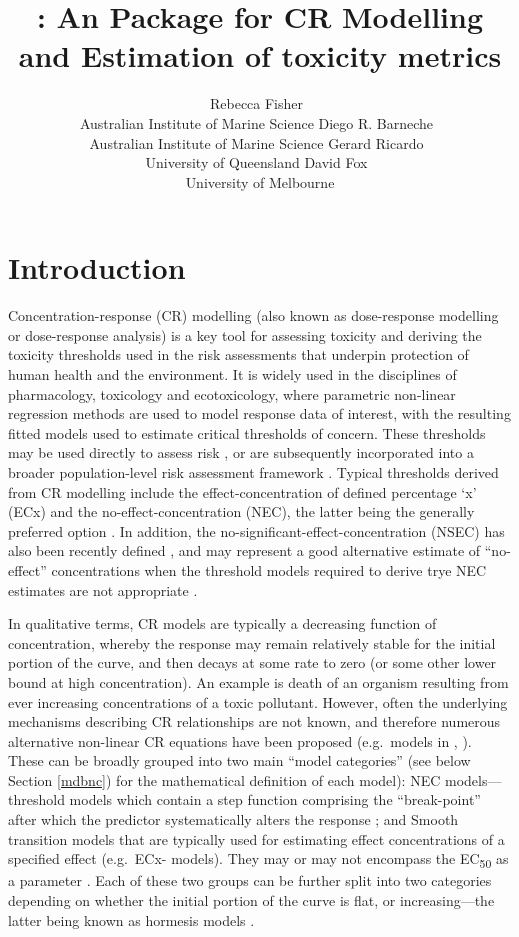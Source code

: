 \documentclass[
  shortnames]{jss}
\author{
Rebecca Fisher~\orcidlink{0000-0001-5148-6731}\\Australian Institute of Marine Science \And Diego R. Barneche~\orcidlink{0000-0002-4568-2362}\\Australian Institute of Marine Science \And Gerard Ricardo~\orcidlink{0000-0002-7761-0806}\\University of Queensland \And David Fox~\orcidlink{0000-0002-3178-7243}\\University of Melbourne
}
\title{\pkg{bayesnec}: An \proglang{R} Package for CR Modelling and Estimation of toxicity metrics}
\begin{document}
\hypertarget{introduction}{%
\section{Introduction}\label{introduction}}

Concentration-response (CR) modelling (also known as dose-response modelling or dose-response analysis) is a key tool for assessing toxicity and deriving the toxicity thresholds used in the risk assessments that underpin protection of human health and the environment. It is widely used in the disciplines of pharmacology, toxicology and ecotoxicology, where parametric non-linear regression methods are used to model response data of interest, with the resulting fitted models used to estimate critical thresholds of concern. These thresholds may be used directly to assess risk \citep[e.g see][]{fisher2018c}, or are subsequently incorporated into a broader population-level risk assessment framework \citep[e.g.][]{Warne2015}. Typical thresholds derived from CR modelling include the effect-concentration of defined percentage `x' (ECx) and the no-effect-concentration (NEC), the latter being the generally preferred option \citep{Fox2008, Warne2015, Warne2018c}. In addition, the no-significant-effect-concentration (NSEC) has also been recently defined \citep{Fisher2023}, and may represent a good alternative estimate of ``no-effect'' concentrations when the threshold models required to derive trye NEC estimates are not appropriate \citep{Fisher2023, fisher2023ieam}.

In qualitative terms, CR models are typically a decreasing function of concentration, whereby the response may remain relatively stable for the initial portion of the curve, and then decays at some rate to zero (or some other lower bound at high concentration). An example is death of an organism resulting from ever increasing concentrations of a toxic pollutant. However, often the underlying mechanisms describing CR relationships are not known, and therefore numerous alternative non-linear CR equations have been proposed (e.g.~models in , \citet{Ritz2016}). These can be broadly grouped into two main ``model categories'' (see below Section \ref{mdbnc}) for the mathematical definition of each model): NEC models---threshold models which contain a step function comprising the ``break-point'' after which the predictor systematically alters the response \citep{Fox2010}; and Smooth transition models that are typically used for estimating effect concentrations of a specified effect (e.g.~ECx- models). They may or may not encompass the EC\textsubscript{50} as a parameter \citep{Ritz2016}. Each of these two groups can be further split into two categories depending on whether the initial portion of the curve is flat, or increasing---the latter being known as hormesis models \citep{Ritz2016}.
\end{document}
